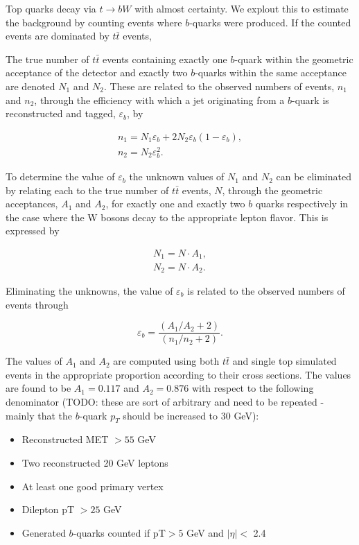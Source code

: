 Top quarks decay via $t\rightarrow bW$ with almost certainty.  
We explout this to estimate the background by counting events where $b$-quarks were produced. 
If the counted events are dominated by $t\bar{t}$ events, 

The true number of $t\bar{t}$ events containing exactly one $b$-quark within the geometric acceptance 
of the detector and exactly two $b$-quarks within the same acceptance are denoted $N_{1}$ and $N_{2}$.  
These are related to the observed numbers of events, $n_{1}$ and $n_{2}$, 
through the efficiency with which a jet originating from a $b$-quark 
is reconstructed and tagged, $\varepsilon_{b}$, by 

\begin{eqnarray}
n_{1} = N_{1}\varepsilon_{b} + 2N_{2}\varepsilon_{b}(1-\varepsilon_{b}) \label{eqn:analysis_bTagEff1_n1},\\
n_{2} = N_{2}\varepsilon_{b}^{2} \label{eqn:analysis_bTagEff1_n2}.
\end{eqnarray}

To determine the value of $\varepsilon_{b}$ the unknown values of $N_{1}$ and $N_{2}$ 
can be eliminated by relating each to the true number of $t\bar{t}$ events, $N$, 
through the geometric acceptances, $A_1$ and $A_2$, for exactly one and exactly two $b$ quarks 
respectively in the case where the W bosons decay to the appropriate lepton flavor. 
This is expressed by

\begin{eqnarray}
N_{1} = N\cdot A_{1}, \\
N_{2} = N\cdot A_{2}.
\end{eqnarray}

Eliminating the unknowns, the value of $\varepsilon_{b}$ is related to the observed numbers of events through 

\begin{equation}
\label{eqn:analysis_bTagEff}
\varepsilon_{b} = \frac{(A_{1}/A_{2} + 2)}{(n_{1}/n_{2}+ 2)}.
\end{equation}

The values of $A_1$ and $A_2$ are computed using both $t\bar{t}$ and single top simulated events
in the appropriate proportion according to their cross sections. The values are found to be
$A_1=0.117$ and $A_2=0.876$ with respect to the following denominator 
(TODO: these are sort of arbitrary and need to be repeated - mainly that the $b$-quark 
$p_{T}$ should be increased to 30 GeV):

\begin{itemize}
    \item Reconstructed MET $> 55$ GeV
    \item Two reconstructed 20 GeV leptons
    \item At least one good primary vertex
    \item Dilepton pT $> 25$ GeV
    \item Generated $b$-quarks counted if pT$>5$ GeV and $|\eta|<$ 2.4
\end{itemize}

